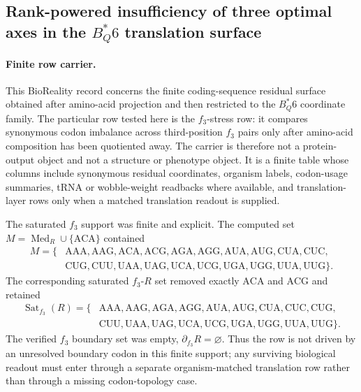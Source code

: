 \subsection{Rank-powered insufficiency of three optimal axes in the $B^*_Q6$ translation surface}
\label{sec:bioreality-q6-three-axis-power-boundary}

\paragraph{Finite row carrier.}
This BioReality record concerns the finite coding-sequence residual surface obtained after amino-acid projection and then restricted to the $B^*_Q6$ coordinate family.  The particular row tested here is the $f_3$-stress row: it compares synonymous codon imbalance across third-position $f_3$ pairs only after amino-acid composition has been quotiented away.  The carrier is therefore not a protein-output object and not a structure or phenotype object.  It is a finite table whose columns include synonymous residual coordinates, organism labels, codon-usage summaries, tRNA or wobble-weight readbacks where available, and translation-layer rows only when a matched translation readout is supplied.

The saturated $f_3$ support was finite and explicit.  The computed set $M=\operatorname{Med}_R\cup\{\mathrm{ACA}\}$ contained
$$
\begin{aligned}
M=\{&\mathrm{AAA},\mathrm{AAG},\mathrm{ACA},\mathrm{ACG},\mathrm{AGA},\mathrm{AGG},\mathrm{AUA},\mathrm{AUG},\mathrm{CUA},\mathrm{CUC},\\
&\mathrm{CUG},\mathrm{CUU},\mathrm{UAA},\mathrm{UAG},\mathrm{UCA},\mathrm{UCG},\mathrm{UGA},\mathrm{UGG},\mathrm{UUA},\mathrm{UUG}\}.
\end{aligned}
$$
The corresponding saturated $f_3$-$R$ set removed exactly $\mathrm{ACA}$ and $\mathrm{ACG}$ and retained
$$
\begin{aligned}
\operatorname{Sat}_{f_3}(R)=\{&\mathrm{AAA},\mathrm{AAG},\mathrm{AGA},\mathrm{AGG},\mathrm{AUA},\mathrm{AUG},\mathrm{CUA},\mathrm{CUC},\mathrm{CUG},\\
&\mathrm{CUU},\mathrm{UAA},\mathrm{UAG},\mathrm{UCA},\mathrm{UCG},\mathrm{UGA},\mathrm{UGG},\mathrm{UUA},\mathrm{UUG}\}.
\end{aligned}
$$
The verified $f_3$ boundary set was empty, $\partial_{f_3}R=\varnothing$.  Thus the row is not driven by an unresolved boundary codon in this finite support; any surviving biological readout must enter through a separate organism-matched translation row rather than through a missing codon-topology case.

